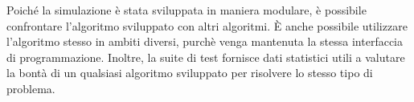 Poiché la simulazione è stata sviluppata in maniera modulare, è possibile confrontare l'algoritmo sviluppato con altri algoritmi. È anche possibile utilizzare l'algoritmo stesso in ambiti diversi, purchè venga mantenuta la stessa interfaccia di programmazione. Inoltre, la suite di test fornisce dati statistici utili a valutare la bontà di un qualsiasi algoritmo sviluppato per risolvere lo stesso tipo di problema. 
